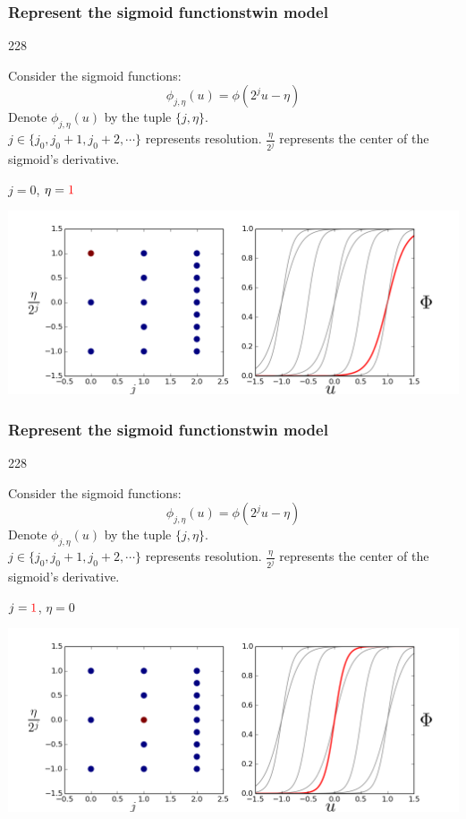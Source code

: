 \documentclass{beamer}
\newcommand{\barrow}{\item[\color{darkred}\ding{228}]}
\begin{document}
\setcounter{framenumber}{16} 
\begin{frame}
    \frametitle{Represent the sigmoid functions\hfill \scriptsize{twin model}}\small
    \begin{dinglist}{228}
        \barrow
        Consider the sigmoid functions:
        $$
            \phi_{j, \eta}(u) = \phi(2^j u - \eta)
        $$
        Denote $\phi_{j, \eta}(u)$ by the tuple $\{j, \eta\}$.\\
        \vspace{.2cm}
        $j\in \{j_0, j_0+1, j_0+2, \cdots \}$ represents resolution. $\frac{\eta}{2^j}$ represents
        the center of the sigmoid's derivative.
        \barrow $j=0$, $\eta=\textcolor{red}{1}$\\
        \begin{center}
            \includegraphics[width=10.cm]{basis_2.png}
        \end{center}
    \end{dinglist}
\end{frame}

\setcounter{framenumber}{16} 
\begin{frame}
    \frametitle{Represent the sigmoid functions\hfill \scriptsize{twin model}}\small
    \begin{dinglist}{228}
        \barrow
        Consider the sigmoid functions:
        $$
            \phi_{j, \eta}(u) = \phi(2^j u - \eta)
        $$
        Denote $\phi_{j, \eta}(u)$ by the tuple $\{j, \eta\}$.\\
        \vspace{.2cm}
        $j\in \{j_0, j_0+1, j_0+2, \cdots \}$ represents resolution. $\frac{\eta}{2^j}$ represents
        the center of the sigmoid's derivative.
        \barrow $j=\textcolor{red}{1}$, $\eta=0$\\
        \begin{center}
            \includegraphics[width=10.cm]{basis_3.png}
        \end{center}
    \end{dinglist}
\end{frame}
\end{document}
